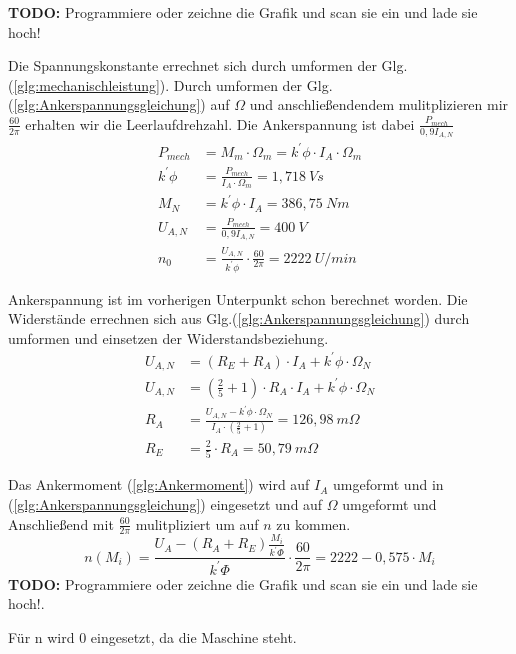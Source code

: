 \begin{solution}
\begin{compactenum}
\item \textbf{TODO:} Programmiere oder zeichne die Grafik und scan sie ein und lade sie hoch!
\item Die Spannungskonstante errechnet sich durch umformen der Glg.(\ref{glg:mechanischleistung}). Durch umformen der Glg.(\ref{glg:Ankerspannungsgleichung}) auf $\Omega$ und anschließendendem mulitplizieren mir $\frac{60}{2 \pi}$ erhalten wir die Leerlaufdrehzahl. Die Ankerspannung ist dabei $\frac{P_{mech}}{0,9 I_{A,N}}$
\begin{align}
P_{mech} &=M_m \cdot \Omega_m = k^{'} \phi \cdot I_A \cdot \Omega_m\\
k^{'} \phi &= \frac{P_{mech}}{I_A \cdot \Omega_m} =1,718~Vs\\
M_N &= k^{'} \phi \cdot I_A = 386,75~Nm\\
U_{A,N} &= \frac{P_{mech}}{0,9 I_{A,N}} =400~V\\
n_0 &= \frac{U_{A,N}}{k^{'} \phi} \cdot \frac{60}{2\pi} =2222~U/min
\end{align}
\item Ankerspannung ist im vorherigen Unterpunkt schon berechnet worden. Die Widerstände errechnen sich aus Glg.(\ref{glg:Ankerspannungsgleichung}) durch umformen und einsetzen der Widerstandsbeziehung.
\begin{align}
U_{A,N} &= (R_E + R_A) \cdot I_A +  k^{'} \phi \cdot \Omega_N\\
U_{A,N} &= \left (\frac{2}{5} + 1 \right ) \cdot R_A \cdot I_A +  k^{'} \phi \cdot \Omega_N\\
R_A &= \frac{U_{A,N}-k^{'} \phi \cdot \Omega_N}{I_A \cdot \left (\frac{2}{5} + 1 \right )}=126,98~m\Omega\\
R_E &= \frac{2}{5} \cdot R_A= 50,79~m\Omega
\end{align}
\item Das Ankermoment (\ref{glg:Ankermoment}) wird auf $I_A$ umgeformt und in (\ref{glg:Ankerspannungsgleichung}) eingesetzt und auf $\Omega$ umgeformt und Anschließend mit $\frac{60}{2 \pi}$ mulitpliziert um auf $n$ zu kommen.
\begin{equation}
n(M_i) = \frac{U_A - (R_A+R_E) \frac{ M_i}{k^{'} \Phi}}{k^{'}\Phi} \cdot \frac{60}{2 \pi} =2222-0,575 \cdot M_i
\end{equation}
\textbf{TODO:} Programmiere oder zeichne die Grafik und scan sie ein und lade sie hoch!.\\
\item Für n wird $0$ eingesetzt, da die Maschine steht.

\end{compactenum}
\end{solution}
